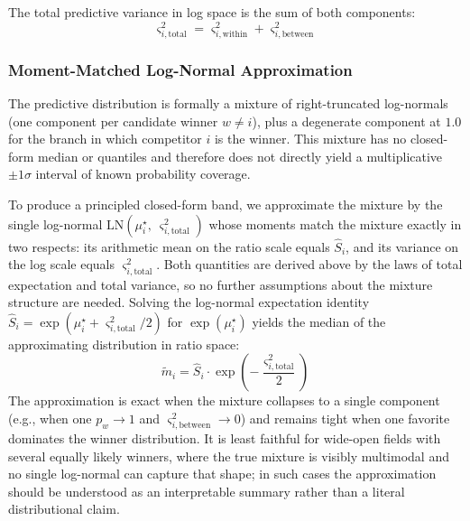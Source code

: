 \documentclass[12pt]{article}
\begin{document}
	The total predictive variance in log space is the sum of both components:
	\begin{equation}
		\varsigma_{i,\mathrm{total}}^2 = \varsigma_{i,\mathrm{within}}^2 + \varsigma_{i,\mathrm{between}}^2
	\end{equation}

	\subsubsection*{Moment-Matched Log-Normal Approximation}
	The predictive distribution is formally a mixture of right-truncated log-normals (one component per candidate winner $w \neq i$), plus a degenerate component at $1.0$ for the branch in which competitor $i$ is the winner. This mixture has no closed-form median or quantiles and therefore does not directly yield a multiplicative $\pm 1\sigma$ interval of known probability coverage.

	To produce a principled closed-form band, we approximate the mixture by the single log-normal $\mathrm{LN}(\mu_i^\star,\ \varsigma_{i,\mathrm{total}}^2)$ whose moments match the mixture exactly in two respects: its arithmetic mean on the ratio scale equals $\hat{S}_i$, and its variance on the log scale equals $\varsigma_{i,\mathrm{total}}^2$. Both quantities are derived above by the laws of total expectation and total variance, so no further assumptions about the mixture structure are needed. Solving the log-normal expectation identity $\hat{S}_i = \exp(\mu_i^\star + \varsigma_{i,\mathrm{total}}^2/2)$ for $\exp(\mu_i^\star)$ yields the median of the approximating distribution in ratio space:
	\begin{equation}
		\tilde{m}_i = \hat{S}_i \cdot \exp\!\left(-\frac{\varsigma_{i,\mathrm{total}}^2}{2}\right)
	\end{equation}
	The approximation is exact when the mixture collapses to a single component (e.g., when one $p_w \to 1$ and $\varsigma_{i,\mathrm{between}}^2 \to 0$) and remains tight when one favorite dominates the winner distribution. It is least faithful for wide-open fields with several equally likely winners, where the true mixture is visibly multimodal and no single log-normal can capture that shape; in such cases the approximation should be understood as an interpretable summary rather than a literal distributional claim.
\end{document}
